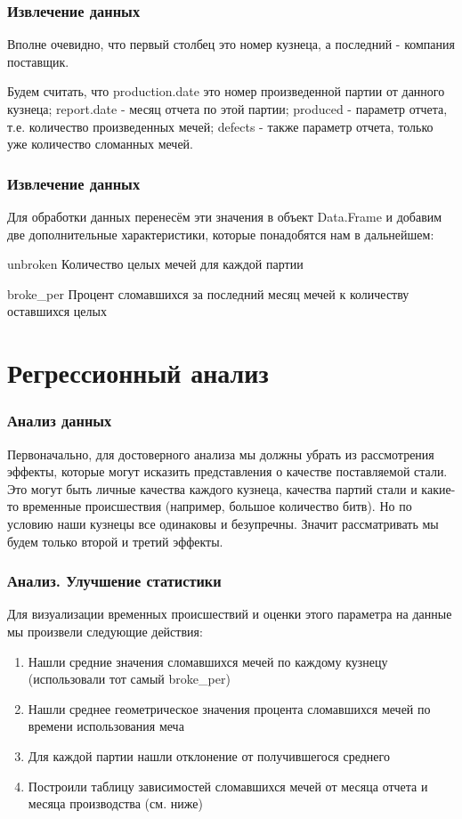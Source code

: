 \documentclass{beamer}
\begin{document}
\begin{frame}
    \frametitle{Извлечение данных}
    Вполне очевидно, что первый столбец это номер кузнеца, а последний - компания поставщик. 
    
    Будем считать, что production.date это номер произведенной партии от данного кузнеца; report.date - месяц отчета по этой партии; produced - параметр отчета, т.е. количество произведенных мечей; defects - также параметр отчета, только уже количество сломанных мечей. 
    
\end{frame}

\begin{frame}
    \frametitle{Извлечение данных}
    
    Для обработки данных перенесём эти значения в объект Data.Frame и добавим две дополнительные характеристики, которые понадобятся нам в дальнейшем:
    \begin{block}{unbroken}
        Количество целых мечей для каждой партии
    \end{block}
    
    \begin{block}{broke\_per}
        Процент сломавшихся за последний месяц мечей к количеству оставшихся целых
    \end{block}
    
\end{frame}

\section{Регрессионный анализ}

\begin{frame}
    \frametitle{Анализ данных}
    Первоначально, для достоверного анализа мы должны убрать из рассмотрения эффекты, которые могут исказить представления о качестве поставляемой стали. Это могут быть личные качества каждого кузнеца, качества партий стали и какие-то временные происшествия (например, большое количество битв). Но по условию наши кузнецы все одинаковы и безупречны. Значит рассматривать мы будем только второй и третий эффекты.
  
\end{frame}


\begin{frame}
    \frametitle{Анализ. Улучшение статистики}
    Для визуализации временных происшествий и оценки этого параметра на данные мы произвели следующие действия:

    \begin{enumerate}
        \item Нашли средние значения сломавшихся мечей по каждому кузнецу (использовали тот самый broke\_per)
        \item Нашли среднее геометрическое значения процента сломавшихся мечей по времени использования меча
        \item Для каждой партии нашли отклонение от получившегося среднего
        \item Построили таблицу зависимостей сломавшихся мечей от месяца отчета и месяца производства (см. ниже)
    \end{enumerate}
\end{frame}
\end{document}
